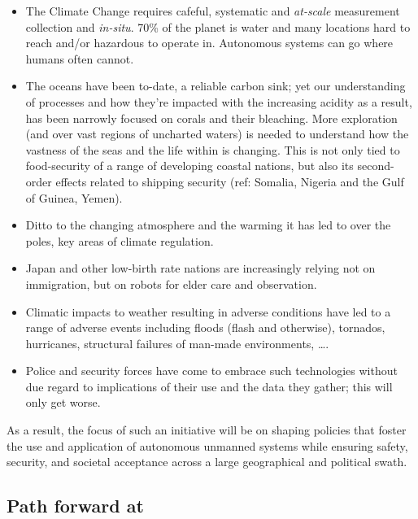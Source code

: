 \documentclass[11pt,letterpaper]{article}
\begin{document}
\begin{itemize}

\item The Climate Change requires cafeful, systematic and
  \emph{at-scale} measurement collection and \emph{in-situ}. 70\% of
  the planet is water and many locations hard to reach and/or
  hazardous to operate in. Autonomous systems can go where humans
  often cannot.

\item The oceans have been to-date, a reliable carbon sink; yet our
  understanding of processes and how they're impacted with the
  increasing acidity as a result, has been narrowly focused on corals
  and their bleaching. More exploration (and over vast regions of
  uncharted waters) is needed to understand how the vastness of the
  seas and the life within is changing. This is not only tied to
  food-security of a range of developing coastal nations, but also its
  second-order effects related to shipping security (ref: Somalia,
  Nigeria and the Gulf of Guinea, Yemen).

\item Ditto to the changing atmosphere and the warming it has led to
  over the poles, key areas of climate regulation.

\item Japan and other low-birth rate nations are increasingly relying
  not on immigration, but on robots for elder care and observation. 

\item Climatic impacts to weather resulting in adverse conditions have
  led to a range of adverse events including floods (flash and
  otherwise), tornados, hurricanes, structural failures of man-made
  environments, \ldots.

\item Police and security forces have come to embrace such
  technologies without due regard to implications of their use and the
  data they gather; this will only get worse.


\end{itemize}

As a result, the focus of such an initiative will be on shaping
policies that foster the use and application of autonomous unmanned
systems while ensuring safety, security, and societal acceptance
across a large geographical and political swath.


\subsection{Path forward at \org}
\end{document}
